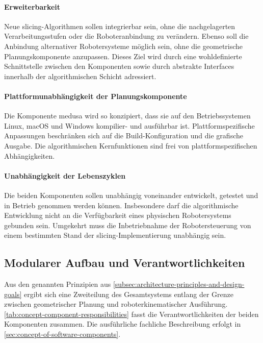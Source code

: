             \paragraph{Erweiterbarkeit}
                Neue \gls{slicing}-Algorithmen sollen integrierbar sein, ohne die nachgelagerten Verarbeitungsstufen oder die Roboteranbindung zu verändern.
                Ebenso soll die Anbindung alternativer Robotersysteme möglich sein, ohne die geometrische Planungskomponente anzupassen.
                Dieses Ziel wird durch eine wohldefinierte Schnittstelle zwischen den Komponenten sowie durch abstrakte Interfaces innerhalb der algorithmischen Schicht adressiert.

            \paragraph{Plattformunabhängigkeit der Planungskomponente}
                Die Komponente \ac{medusa} wird so konzipiert, dass sie auf den Betriebssystemen Linux, macOS und Windows kompilier- und ausführbar ist.
                Plattformspezifische Anpassungen beschränken sich auf die Build-Konfiguration und die grafische Ausgabe.
                Die algorithmischen Kernfunktionen sind frei von plattformspezifischen Abhängigkeiten.

            \paragraph{Unabhängigkeit der Lebenszyklen}
                Die beiden Komponenten sollen unabhängig voneinander entwickelt, getestet und in Betrieb genommen werden können.
                Insbesondere darf die algorithmische Entwicklung nicht an die Verfügbarkeit eines physischen Robotersystems gebunden sein.
                Umgekehrt muss die Inbetriebnahme der Robotersteuerung von einem bestimmten Stand der \gls{slicing}-Implementierung unabhängig sein.

        \subsection{Modularer Aufbau und Verantwortlichkeiten}\label{subsec:modular-structure-and-responsibilities}
            Aus den genannten Prinzipien aus \cref{subsec:architecture-principles-and-design-goals} ergibt sich eine Zweiteilung des Gesamtsystems entlang der Grenze zwischen geometrischer Planung und roboterkinematischer Ausführung.
            \cref{tab:concept-component-responsibilities} fasst die Verantwortlichkeiten der beiden Komponenten zusammen.
            Die ausführliche fachliche Beschreibung erfolgt in \cref{sec:concept-of-software-components}.

